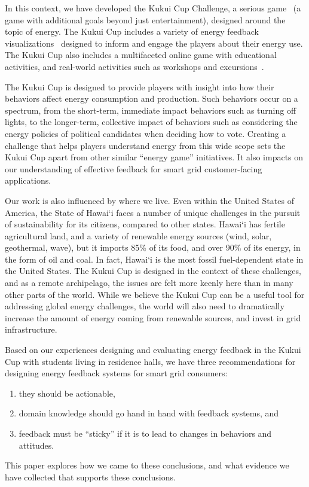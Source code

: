 \documentclass[10pt, conference, compsocconf]{IEEEtran-old}
\begin{document}
In this context, we have developed the Kukui Cup Challenge, a serious game~\cite{Zyda2005} (a game with additional goals beyond just entertainment), designed around the topic of energy. The Kukui Cup includes a variety of energy feedback visualizations~\cite{Froehlich2010} designed to inform and engage the players about their energy use. The Kukui Cup also includes a multifaceted online game with educational activities, and real-world activities such as workshops and excursions~\cite{csdl2-10-07, csdl2-10-08}.

The Kukui Cup is designed to provide players with insight into how their behaviors affect energy consumption and production. Such behaviors occur on a spectrum, from the short-term, immediate impact behaviors such as turning off lights, to the longer-term, collective impact of behaviors such as considering the energy policies of political candidates when deciding how to vote. Creating a challenge that helps players understand energy from this wide scope sets the Kukui Cup apart from other similar ``energy game'' initiatives. It also impacts on our understanding of effective feedback for smart grid customer-facing applications.

Our work is also influenced by where we live. Even within the United States of America, the State of Hawai`i faces a number of unique challenges in the pursuit of sustainability for its citizens, compared to other states. Hawai`i has fertile agricultural land, and a variety of renewable energy sources (wind, solar, geothermal, wave), but it imports 85\% of its food, and over 90\% of its energy, in the form of oil and coal. In fact, Hawai`i is the most fossil fuel-dependent state in the United States. The Kukui Cup is designed in the context of these challenges, and as a remote archipelago, the issues are felt more keenly here than in many other parts of the world. While we believe the Kukui Cup can be a useful tool for addressing global energy challenges, the world will also need to dramatically increase the amount of energy coming from renewable sources, and invest in grid infrastructure. 

Based on our experiences designing and evaluating energy feedback in the Kukui Cup with students living in residence halls, we have three recommendations for designing energy feedback systems for smart grid consumers:
\begin{enumerate}
	\item they should be actionable,
	\item domain knowledge should go hand in hand with feedback systems, and
	\item feedback must be ``sticky'' if it is to lead to changes in behaviors and attitudes.
\end{enumerate}
This paper explores how we came to these conclusions, and what evidence we have collected that supports these conclusions.
\end{document}
